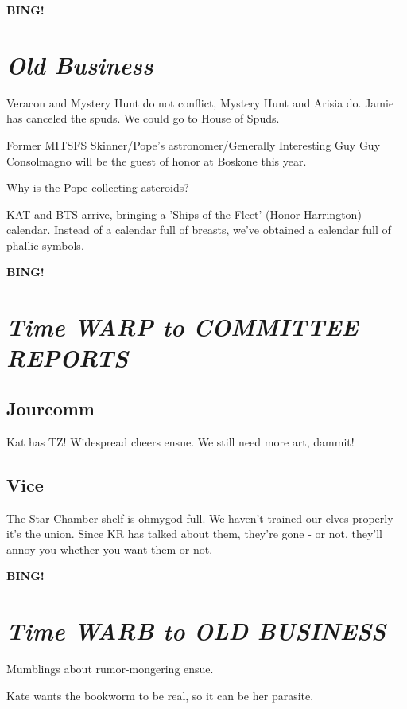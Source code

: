 \documentclass[10pt]{article}
\newcommand{\bing}{{\bf BING!} }
\newcommand{\goto}[1]{\bing \vskip 12pt \section*{{\em{#1}}}}
\begin{document}




\goto{Old Business}

Veracon and Mystery Hunt do not conflict, Mystery Hunt and Arisia do. Jamie has canceled the spuds. We could go to House of Spuds.

Former MITSFS Skinner/Pope's astronomer/Generally Interesting Guy Guy Consolmagno will be the guest of honor at Boskone this year.

Why is the Pope collecting asteroids?

KAT and BTS arrive, bringing a 'Ships of the Fleet' (Honor Harrington) calendar. Instead of a calendar full of breasts, we've obtained a calendar full of phallic symbols. 

\goto{Time WARP to COMMITTEE REPORTS}
\subsection*{Jourcomm}
Kat has TZ! Widespread cheers ensue. We still need more art, dammit!

\subsection*{Vice}
The Star Chamber shelf is ohmygod full. We haven't trained our elves properly - it's the union. Since KR has talked about them, they're gone - or not, they'll annoy you whether you want them or not.

\goto{Time WARB to OLD BUSINESS}

Mumblings about rumor-mongering ensue.

Kate wants the bookworm to be real, so it can be her parasite.
\end{document}
